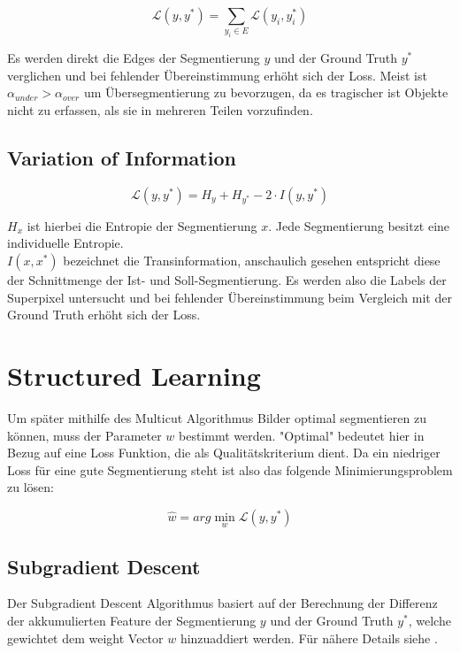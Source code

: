 \begin{equation}
\mathcal{L}(y, y^*) = \sum\limits_{y_i \in E} \mathcal{L}(y_i, y_i^*)
\end{equation}


Es werden direkt die Edges der Segmentierung $y$ und der Ground Truth $y^*$ verglichen und bei fehlender Übereinstimmung erhöht sich der Loss. Meist ist $\alpha_{under} > \alpha_{over}$ um Übersegmentierung zu bevorzugen, da es tragischer ist Objekte nicht zu erfassen, als sie in mehreren Teilen vorzufinden. 

\subsection{Variation of Information}\label{sec:voi}

\begin{equation}
\mathcal{L}(y, y^*) = H_y + H_{y^*} - 2 \cdot I(y, y^*)
\end{equation}

$H_x$ ist hierbei die Entropie der Segmentierung $x$. Jede Segmentierung besitzt eine individuelle Entropie.  \\
$I(x, x^*)$ bezeichnet die Transinformation, anschaulich gesehen entspricht diese der Schnittmenge der Ist- und Soll-Segmentierung. 
Es werden also die Labels der Superpixel untersucht und bei fehlender Übereinstimmung beim Vergleich mit der Ground Truth erhöht sich der Loss.

\section{Structured Learning}\label{sec:strucLearn}

Um später mithilfe des Multicut Algorithmus Bilder optimal segmentieren zu können, muss der Parameter $w$ bestimmt werden. "Optimal" bedeutet hier in Bezug auf eine Loss Funktion, die als Qualitätskriterium dient. Da ein niedriger Loss für eine gute Segmentierung steht ist also das folgende Minimierungsproblem zu lösen:

\begin{equation}
\hat{w} = arg\min_{w} \mathcal{L}(y, y^*)
\end{equation}

\subsection{Subgradient Descent}

Der Subgradient Descent Algorithmus basiert auf der Berechnung der Differenz der akkumulierten Feature der Segmentierung $y$ und der Ground Truth $y^*$, welche gewichtet dem weight Vector $w$ hinzuaddiert werden. Für nähere Details siehe \cite{NowozinStrucLearn11}.


